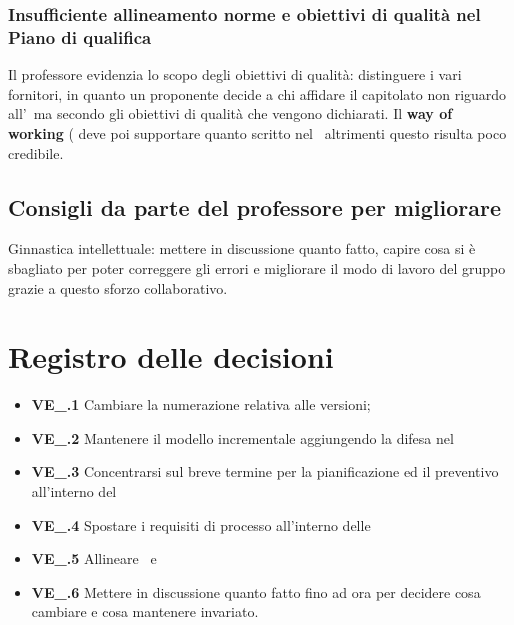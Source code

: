 \subsubsection{Insufficiente allineamento norme e obiettivi di qualità nel Piano di qualifica}
Il professore evidenzia lo scopo degli obiettivi di qualità: distinguere i vari fornitori, in quanto un proponente decide a chi affidare il capitolato non riguardo all'\AdR\, ma secondo gli obiettivi di qualità che vengono dichiarati. Il \textbf{way of working} (\NdP\) deve poi supportare quanto scritto nel \PdQ\, altrimenti questo risulta poco credibile.
\subsection{Consigli da parte del professore per migliorare}
Ginnastica intellettuale: mettere in discussione quanto fatto, capire cosa si è sbagliato per poter correggere gli errori e migliorare il modo di lavoro del gruppo grazie a questo sforzo collaborativo.

\section{Registro delle decisioni}
\begin{itemize}
	\item \textbf{VE\_\Data.1} Cambiare la numerazione relativa alle versioni;
	\item \textbf{VE\_\Data.2} Mantenere il modello incrementale aggiungendo la difesa nel \PdP\;
	\item \textbf{VE\_\Data.3} Concentrarsi sul breve termine per la pianificazione ed il preventivo all'interno del \PdP\;
	\item \textbf{VE\_\Data.4} Spostare i requisiti di processo all'interno delle \NdP\;
	\item \textbf{VE\_\Data.5} Allineare \NdP\ e \PdQ\;
	\item \textbf{VE\_\Data.6} Mettere in discussione quanto fatto fino ad ora per decidere cosa cambiare e cosa mantenere invariato.
\end{itemize}